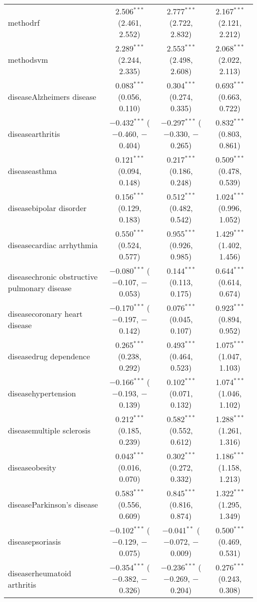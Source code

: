 \begin{table}[!htbp]
\begin{tabular}{@{\extracolsep{5pt}}lccc}
  methodrf & 2.506$^{***}$ (2.461, 2.552) & 2.777$^{***}$ (2.722, 2.832) & 2.167$^{***}$ (2.121, 2.212) \\ 
  methodsvm & 2.289$^{***}$ (2.244, 2.335) & 2.553$^{***}$ (2.498, 2.608) & 2.068$^{***}$ (2.022, 2.113) \\ 
  diseaseAlzheimers disease & 0.083$^{***}$ (0.056, 0.110) & 0.304$^{***}$ (0.274, 0.335) & 0.693$^{***}$ (0.663, 0.722) \\ 
  diseasearthritis & $-$0.432$^{***}$ ($-$0.460, $-$0.404) & $-$0.297$^{***}$ ($-$0.330, $-$0.265) & 0.832$^{***}$ (0.803, 0.861) \\ 
  diseaseasthma & 0.121$^{***}$ (0.094, 0.148) & 0.217$^{***}$ (0.186, 0.248) & 0.509$^{***}$ (0.478, 0.539) \\ 
  diseasebipolar disorder & 0.156$^{***}$ (0.129, 0.183) & 0.512$^{***}$ (0.482, 0.542) & 1.024$^{***}$ (0.996, 1.052) \\ 
  diseasecardiac arrhythmia & 0.550$^{***}$ (0.524, 0.577) & 0.955$^{***}$ (0.926, 0.985) & 1.429$^{***}$ (1.402, 1.456) \\ 
  diseasechronic obstructive pulmonary disease & $-$0.080$^{***}$ ($-$0.107, $-$0.053) & 0.144$^{***}$ (0.113, 0.175) & 0.644$^{***}$ (0.614, 0.674) \\ 
  diseasecoronary heart disease & $-$0.170$^{***}$ ($-$0.197, $-$0.142) & 0.076$^{***}$ (0.045, 0.107) & 0.923$^{***}$ (0.894, 0.952) \\ 
  diseasedrug dependence & 0.265$^{***}$ (0.238, 0.292) & 0.493$^{***}$ (0.464, 0.523) & 1.075$^{***}$ (1.047, 1.103) \\ 
  diseasehypertension & $-$0.166$^{***}$ ($-$0.193, $-$0.139) & 0.102$^{***}$ (0.071, 0.132) & 1.074$^{***}$ (1.046, 1.102) \\ 
  diseasemultiple sclerosis & 0.212$^{***}$ (0.185, 0.239) & 0.582$^{***}$ (0.552, 0.612) & 1.288$^{***}$ (1.261, 1.316) \\ 
  diseaseobesity & 0.043$^{***}$ (0.016, 0.070) & 0.302$^{***}$ (0.272, 0.332) & 1.186$^{***}$ (1.158, 1.213) \\ 
  diseaseParkinson's disease & 0.583$^{***}$ (0.556, 0.609) & 0.845$^{***}$ (0.816, 0.874) & 1.322$^{***}$ (1.295, 1.349) \\ 
  diseasepsoriasis & $-$0.102$^{***}$ ($-$0.129, $-$0.075) & $-$0.041$^{**}$ ($-$0.072, $-$0.009) & 0.500$^{***}$ (0.469, 0.531) \\ 
  diseaserheumatoid arthritis & $-$0.354$^{***}$ ($-$0.382, $-$0.326) & $-$0.236$^{***}$ ($-$0.269, $-$0.204) & 0.276$^{***}$ (0.243, 0.308) \\ 

\end{tabular}
\end{table}
